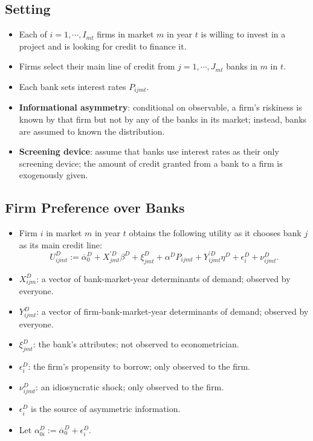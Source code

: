 \documentclass[
]{book}
\providecommand{\tightlist}{%
  \setlength{\itemsep}{0pt}\setlength{\parskip}{0pt}}
\begin{document}
\hypertarget{setting}{%
\subsection{Setting}\label{setting}}

\begin{itemize}
\tightlist
\item
  Each of \(i = 1, \cdots, I_{mt}\) firms in market \(m\) in year \(t\) is willing to invest in a project and is looking for credit to finance it.
\item
  Firms select their main line of credit from \(j = 1, \cdots, J_{mt}\) banks in \(m\) in \(t\).
\item
  Each bank sets interest rates \(P_{ijmt}\).
\item
  \textbf{Informational asymmetry}: conditional on observable, a firm's riskiness is known by that firm but not by any of the banks in its market; instead, banks are assumed to known the distribution.
\item
  \textbf{Screening device}: assume that banks use interest rates as their only screening device; the amount of credit granted from a bank to a firm is exogenously given.
\end{itemize}

\hypertarget{firm-preference-over-banks}{%
\subsection{Firm Preference over Banks}\label{firm-preference-over-banks}}

\begin{itemize}
\tightlist
\item
  Firm \(i\) in market \(m\) in year \(t\) obtains the following utility as it chooses bank \(j\) as its main credit line:
  \begin{equation}
  U_{ijmt}^D := \overline{\alpha}_0^D + X_{jmt}^{\prime D} \beta^D + \xi_{jmt}^D + \alpha^D P_{ijmt} + Y_{ijmt}^{\prime D} \eta^D + \epsilon_i^D + \nu_{ijmt}^D. \label{eq:demand-utility}
  \end{equation}
\item
  \(X_{ijm}^D\): a vector of bank-market-year determinants of demand; observed by everyone.
\item
  \(Y_{ijmt}^D\): a vector of firm-bank-market-year determinants of demand; observed by everyone.
\item
  \(\xi_{jmt}^D\): the bank's attributes; not observed to econometrician.
\item
  \(\epsilon_i^D\): the firm's propensity to borrow; only observed to the firm.
\item
  \(\nu_{ijmt}^D\): an idiosyncratic shock; only observed to the firm.
\item
  \(\epsilon_i^D\) is the source of asymmetric information.
\item
  Let \(\alpha_{0i}^D := \overline{\alpha}_0^D + \epsilon_i^D\).
\end{itemize}
\end{document}
